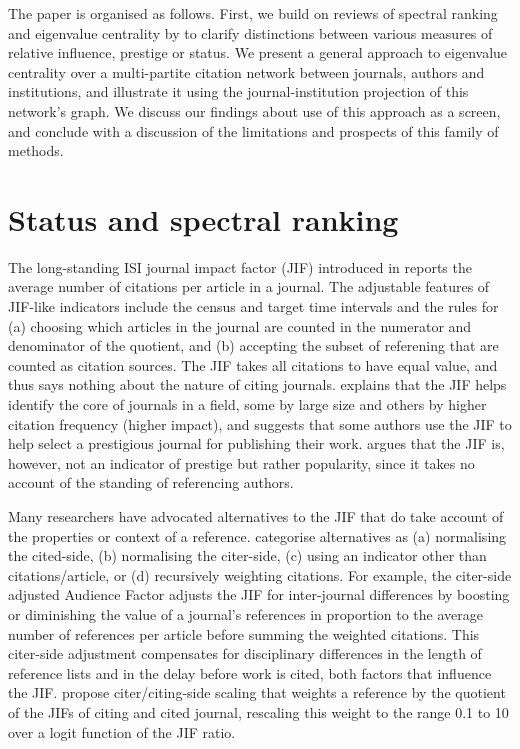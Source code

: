 \documentclass[10pt]{article}
\begin{document}
The paper is organised as follows. First, we build on reviews of spectral ranking and eigenvalue centrality by \cite{franceschetPageRankStandingShoulders2011, vignaSpectralRanking2016} to clarify distinctions between various measures of relative influence, prestige or status. We present a general approach to eigenvalue centrality over a multi-partite citation network between journals, authors and institutions, and illustrate it using the journal-institution projection of this network's graph. We discuss our findings about use of this approach as a screen, and conclude with a discussion of the limitations and prospects of this family of methods. 

\section{Status and spectral ranking}

The long-standing ISI journal impact factor (JIF) introduced in \cite{garfield1955, garfieldHistoryMeaningJournal2006} reports the average number of citations per article in a journal. The adjustable features of JIF-like indicators include the census and target time intervals and the rules for (a) choosing which articles in the journal are counted in the numerator and denominator of the quotient, and (b) accepting the subset of referening that are counted as citation sources. The JIF takes all citations to have equal value, and thus says nothing about the nature of citing journals. \cite{garfieldHistoryMeaningJournal2006} explains that the JIF helps identify the core of journals in a field, some by large size and others by higher citation frequency (higher impact), and suggests that some authors use the JIF to help select a prestigious journal for publishing their work. \cite{bollenJournalStatus2006a} argues that the JIF is, however, not an indicator of prestige but rather popularity, since it takes no account of the standing of referencing authors. 
 
Many researchers have advocated alternatives to the JIF that do take account of the properties or context of a reference. \cite{waltmanRelationEigenfactorAudience2010} categorise alternatives as (a) normalising the cited-side, (b) normalising the citer-side, (c) using an indicator other than citations/article, or (d) recursively weighting citations. For example, the citer-side adjusted Audience Factor \citep{zitt2008} adjusts the JIF for inter-journal differences by boosting or diminishing the value of a journal's references in proportion to the average number of references per article before summing the weighted citations. This citer-side adjustment compensates for disciplinary differences in the length of reference lists and in the delay before work is cited, both factors that influence the JIF. \cite{habibzadehJournalWeightedImpact2008} propose citer/citing-side scaling that weights a reference by the quotient of the JIFs of citing and cited journal, rescaling this weight to the range 0.1 to 10 over a logit function of the JIF ratio. 
\end{document}
